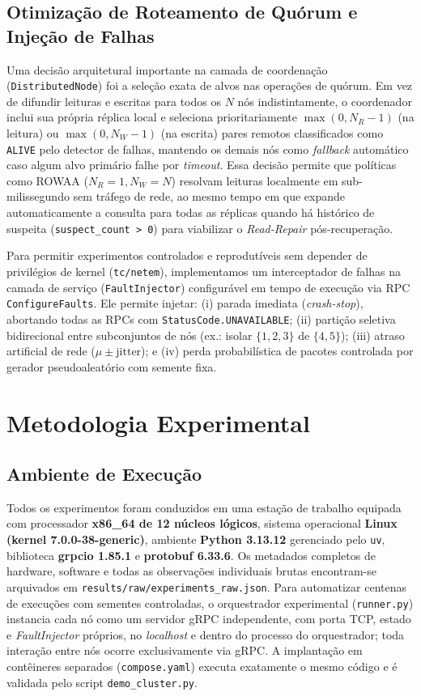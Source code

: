 \documentclass[conference,10pt]{IEEEtran}
\begin{document}
\subsection{Otimização de Roteamento de Quórum e Injeção de Falhas}

Uma decisão arquitetural importante na camada de coordenação (\texttt{DistributedNode}) foi a seleção exata de alvos nas operações de quórum. Em vez de difundir leituras e escritas para todos os $N$ nós indistintamente, o coordenador inclui sua própria réplica local e seleciona prioritariamente $\max(0, N_R - 1)$ (na leitura) ou $\max(0, N_W - 1)$ (na escrita) pares remotos classificados como \texttt{ALIVE} pelo detector de falhas, mantendo os demais nós como \textit{fallback} automático caso algum alvo primário falhe por \textit{timeout}. Essa decisão permite que políticas como ROWAA ($N_R=1, N_W=N$) resolvam leituras localmente em sub-milissegundo sem tráfego de rede, ao mesmo tempo em que expande automaticamente a consulta para todas as réplicas quando há histórico de suspeita (\texttt{suspect\_count > 0}) para viabilizar o \textit{Read-Repair} pós-recuperação.

Para permitir experimentos controlados e reprodutíveis sem depender de privilégios de kernel (\texttt{tc/netem}), implementamos um interceptador de falhas na camada de serviço (\texttt{FaultInjector}) configurável em tempo de execução via RPC \texttt{ConfigureFaults}. Ele permite injetar: (i) parada imediata (\textit{crash-stop}), abortando todas as RPCs com \texttt{StatusCode.UNAVAILABLE}; (ii) partição seletiva bidirecional entre subconjuntos de nós (ex.: isolar $\{1,2,3\}$ de $\{4,5\}$); (iii) atraso artificial de rede ($\mu \pm \text{jitter}$); e (iv) perda probabilística de pacotes controlada por gerador pseudoaleatório com semente fixa.

\section{Metodologia Experimental}

\subsection{Ambiente de Execução}

Todos os experimentos foram conduzidos em uma estação de trabalho equipada com processador \textbf{x86\_64 de 12 núcleos lógicos}, sistema operacional \textbf{Linux (kernel 7.0.0-38-generic)}, ambiente \textbf{Python 3.13.12} gerenciado pelo \texttt{uv}, biblioteca \textbf{grpcio 1.85.1} e \textbf{protobuf 6.33.6}. Os metadados completos de hardware, software e todas as observações individuais brutas encontram-se arquivados em \texttt{results/raw/experiments\_raw.json}. Para automatizar centenas de execuções com sementes controladas, o orquestrador experimental (\texttt{runner.py}) instancia cada nó como um servidor gRPC independente, com porta TCP, estado e \textit{FaultInjector} próprios, no \textit{localhost} e dentro do processo do orquestrador; toda interação entre nós ocorre exclusivamente via gRPC. A implantação em contêineres separados (\texttt{compose.yaml}) executa exatamente o mesmo código e é validada pelo script \texttt{demo\_cluster.py}.
\end{document}

